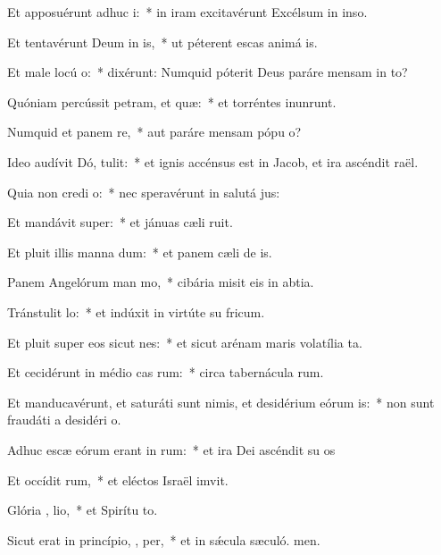 \item Et apposuérunt adhuc  i:~* in iram excitavérunt Excélsum in inso.
\item Et tentavérunt Deum in  is,~* ut péterent escas animá is.
\item Et male locú   o:~* dixérunt: Numquid póterit Deus paráre mensam in to?
\item Quóniam percússit petram, et  quæ:~* et torréntes inunrunt.
\item Numquid et panem  re,~* aut paráre mensam pópu o?
\item Ideo audívit Dó,  tulit:~* et ignis accénsus est in Jacob, et ira ascéndit  raël.
\item Quia non credi  o:~* nec speravérunt in salutá jus:
\item Et mandávit  super:~* et jánuas cæli ruit.
\item Et pluit illis manna  dum:~* et panem cæli de is.
\item Panem Angelórum man mo,~* cibária misit eis in abtia.
\item Tránstulit   lo:~* et indúxit in virtúte su fricum.
\item Et pluit super eos sicut  nes:~* et sicut arénam maris volatília ta.
\item Et cecidérunt in médio cas rum:~* circa tabernácula rum.
\item Et manducavérunt, et saturáti sunt nimis, et desidérium eórum  is:~* non sunt fraudáti a desidéri o.
\item Adhuc escæ eórum erant in  rum:~* et ira Dei ascéndit su os
\item Et occídit  rum,~* et eléctos Israël imvit.
\item Glória ,  lio,~* et Spirítu to.
\item Sicut erat in princípio,  ,  per,~* et in sǽcula sæculó. men.
